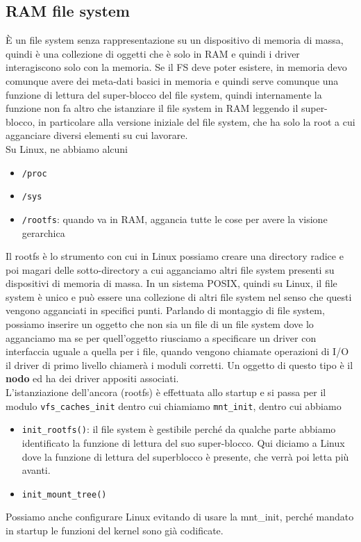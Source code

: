\documentclass[12pt, oneside]{extbook}
\begin{document}
\subsection{RAM file system}
È un file system senza rappresentazione su un dispositivo di memoria di massa, quindi è una collezione di oggetti che è solo in RAM e quindi i driver interagiscono solo con la memoria. Se il FS deve poter esistere, in memoria devo comunque avere dei meta-dati basici in memoria e quindi serve comunque una funzione di lettura del super-blocco del file system, quindi internamente la funzione non fa altro che istanziare il file system in RAM leggendo il super-blocco, in particolare alla versione iniziale del file system, che ha solo la root a cui agganciare diversi elementi su cui lavorare.\\Su Linux, ne abbiamo alcuni
\begin{itemize}
\item \texttt{/proc}
\item \texttt{/sys}
\item \texttt{/rootfs}: quando va in RAM, aggancia tutte le cose per avere la visione gerarchica
\end{itemize}
Il rootfs è lo strumento con cui in Linux possiamo creare una directory radice e poi magari delle sotto-directory a cui agganciamo altri file system presenti su dispositivi di memoria di massa. In un sistema POSIX, quindi su Linux, il file system è unico e può essere una collezione di altri file system nel senso che questi vengono agganciati in specifici punti. Parlando di montaggio di file system, possiamo inserire un oggetto che non sia un file di un file system dove lo agganciamo ma se per quell'oggetto riusciamo a specificare un driver con interfaccia uguale a quella per i file, quando vengono chiamate operazioni di I/O il driver di primo livello chiamerà i moduli corretti. Un oggetto di questo tipo è il \textbf{nodo} ed ha dei driver appositi associati.\\L'istanziazione dell'ancora (rootfs) è effettuata allo startup e si passa per il modulo \texttt{vfs\_caches\_init} dentro cui chiamiamo \texttt{mnt\_init}, dentro cui abbiamo
\begin{itemize}
\item \texttt{init\_rootfs()}: il file system è gestibile perché da qualche parte abbiamo identificato la funzione di lettura del suo super-blocco. Qui diciamo a Linux dove la funzione di lettura del superblocco è presente, che verrà poi letta più avanti. 
\item \texttt{init\_mount\_tree()}
\end{itemize}
Possiamo anche configurare Linux evitando di usare la mnt\_init, perché mandato in startup le funzioni del kernel sono già codificate.
\end{document}
